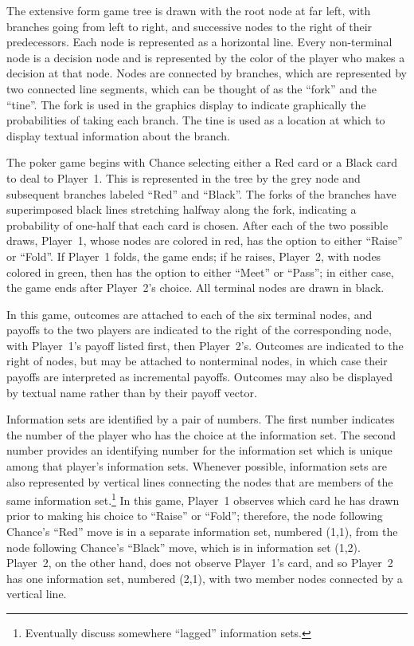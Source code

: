 \documentclass[12pt]{report}
\begin{document}
The extensive form game tree is drawn with the root node at far left,
with branches going from left to right, and successive nodes to the
right of their predecessors.  Each node is represented as a horizontal
line.  Every non-terminal node is a decision node and is represented
by the color of the player who makes a decision at that node.  Nodes
are connected by branches, which are represented by two connected line
segments, which can be thought of as the ``fork'' and the ``tine''.
The fork is used in the graphics display to indicate graphically the
probabilities of taking each branch.  The tine is used as a location
at which to display textual information about the branch.

The poker game begins with Chance selecting either a Red card or
a Black card to deal to Player~1.  This is represented in the tree
by the grey node and subsequent branches labeled ``Red'' and ``Black''.
The forks of the branches have superimposed black lines stretching
halfway along the fork, indicating a probability of one-half that
each card is chosen.  After each of the two possible draws, Player~1,
whose nodes are colored in red, has the option to either ``Raise'' or
``Fold''.  If Player~1 folds, the game ends; if he raises, Player~2,
with nodes colored in green,
then has the option to either ``Meet'' or ``Pass''; in either case,
the game ends after Player~2's choice.   All terminal nodes are drawn
in black.

In this game, outcomes are attached to each of the six terminal
nodes, and payoffs to the two players are indicated to the right
of the corresponding node, with Player~1's payoff listed first, then
Player~2's.  Outcomes are indicated to the right of nodes, but may
be attached to nonterminal nodes, in which case their payoffs are 
interpreted as incremental payoffs.   Outcomes may also be displayed
by textual name rather than by their payoff vector.

Information sets are identified by a pair of numbers.  The first
number indicates the number of the player who has the choice at the information
set.  The second number provides an identifying number for the
information set which is unique among that player's information sets.
Whenever possible, information sets are also
represented by vertical lines connecting the nodes that are members of
the same information set.\footnote{Eventually discuss somewhere
``lagged'' information sets.}  In this game, Player~1 observes which
card he has drawn prior to making his choice to ``Raise'' or ``Fold'';
therefore, the node following Chance's ``Red'' move is in a separate
information set, numbered (1,1), from the node following Chance's
``Black'' move, which is in information set (1,2).  Player~2, on the
other hand, does not observe Player~1's card, and so Player~2 has one
information set, numbered (2,1), with two member nodes connected by
a vertical line.
\end{document}
